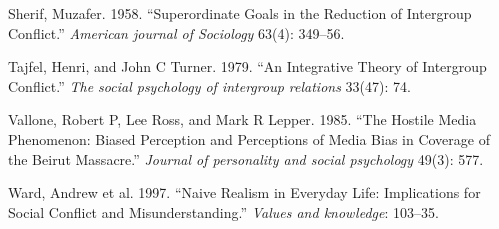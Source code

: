 \documentclass[11pt]{article}
\begin{document}
\leavevmode\hypertarget{ref-sherif1958superordinate}{}%
Sherif, Muzafer. 1958. ``Superordinate Goals in the Reduction of
Intergroup Conflict.'' \emph{American journal of Sociology} 63(4):
349--56.

\leavevmode\hypertarget{ref-tajfel1979integrative}{}%
Tajfel, Henri, and John C Turner. 1979. ``An Integrative Theory of
Intergroup Conflict.'' \emph{The social psychology of intergroup
relations} 33(47): 74.

\leavevmode\hypertarget{ref-vallone1985hostileMedia}{}%
Vallone, Robert P, Lee Ross, and Mark R Lepper. 1985. ``The Hostile
Media Phenomenon: Biased Perception and Perceptions of Media Bias in
Coverage of the Beirut Massacre.'' \emph{Journal of personality and
social psychology} 49(3): 577.

\leavevmode\hypertarget{ref-ward1997naive}{}%
Ward, Andrew et al. 1997. ``Naive Realism in Everyday Life: Implications
for Social Conflict and Misunderstanding.'' \emph{Values and knowledge}:
103--35.
\end{document}
